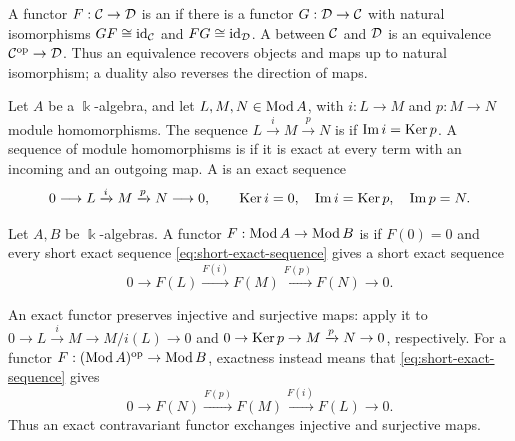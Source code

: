 A functor $F:\mathcal{C}\to\mathcal{D}$ is an  if there is a functor $G:\mathcal{D}\to\mathcal{C}$ with natural isomorphisms $GF\cong\operatorname{id}_{\mathcal{C}}$ and $FG\cong\operatorname{id}_{\mathcal{D}}$.
A  between $\mathcal{C}$ and $\mathcal{D}$ is an equivalence $\mathcal{C}^{\mathrm{op}}\to\mathcal{D}$.
Thus an equivalence recovers objects and maps up to natural isomorphism; a duality also reverses the direction of maps.

\begin{definition}\label{def:exact-sequence}
Let $A$ be a $\Bbbk$-algebra, and let $L,M,N\in\operatorname{\mathrm{Mod}} A$, with $i:L\to M$ and $p:M\to N$ module homomorphisms.
The sequence $L\xrightarrow{i}M\xrightarrow{p}N$ is  if $\operatorname{Im}\nolimits i=\operatorname{Ker}\nolimits p$.  
A sequence of module homomorphisms is  if it is exact at every term with an incoming and an outgoing map.
A  is an exact sequence
\begin{equation}\label{eq:short-exact-sequence}
0\longrightarrow L\xrightarrow{i}M\xrightarrow{p}N\longrightarrow0,
\qquad
\operatorname{Ker}\nolimits i=0,\quad\operatorname{Im}\nolimits i=\operatorname{Ker}\nolimits p,\quad\operatorname{Im}\nolimits p=N.
\end{equation}
\end{definition}


\begin{definition}\label{def:exact-functor}\label{def:exact-contravariant}
Let $A,B$ be $\Bbbk$-algebras.
A functor $F:\operatorname{\mathrm{Mod}} A\to\operatorname{\mathrm{Mod}} B$ is  if $F(0)=0$ and every short exact sequence \eqref{eq:short-exact-sequence} gives a short exact sequence
\[
0\longrightarrow F(L)\xrightarrow{F(i)}F(M)\xrightarrow{F(p)}F(N)\longrightarrow0.
\]
\end{definition}

An exact functor preserves injective and surjective maps: apply it to
$0\to L\xrightarrow{i}M\to M/i(L)\to0$ and $0\to\operatorname{Ker}\nolimits p\to M\xrightarrow{p}N\to0$, respectively.
For a functor $F:(\operatorname{\mathrm{Mod}} A)^{\mathrm{op}}\to\operatorname{\mathrm{Mod}} B$, exactness instead means that \eqref{eq:short-exact-sequence} gives
\[
0\longrightarrow F(N)\xrightarrow{F(p)}F(M)\xrightarrow{F(i)}F(L)\longrightarrow0.
\]
Thus an exact contravariant functor exchanges injective and surjective maps.

